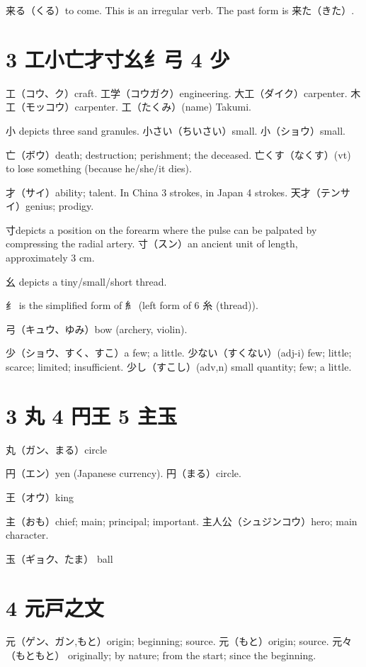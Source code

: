 来る（くる）to come.
This is an irregular verb.
The past form is 来た（きた）.

\section{3 工小亡才寸幺纟弓 4 少}

工（コウ、ク）craft.
工学（コウガク）engineering.
大工（ダイク）carpenter.
木工（モッコウ）carpenter.
工（たくみ）(name) Takumi.

小 depicts three sand granules.
小さい（ちいさい）small.
小（ショウ）small.

亡（ボウ）death; destruction; perishment; the deceased.
亡くす（なくす）(vt) to lose something (because he/she/it dies).

才（サイ）ability; talent.
In China 3 strokes, in Japan 4 strokes.
天才（テンサイ）genius; prodigy.

寸depicts a position on the forearm
where the pulse can be palpated by compressing the radial artery.
寸（スン）an ancient unit of length, approximately 3 cm.

幺 depicts a tiny/small/short thread.

纟 is the simplified form of 糹
(left form of 6 糸 (thread)).

弓（キュウ、ゆみ）bow (archery, violin).

少（ショウ、すく、すこ）a few; a little.
少ない（すくない）(adj-i) few; little; scarce; limited; insufficient.
少し（すこし）(adv,n) small quantity; few; a little.

\section{3 丸 4 円王 5 主玉}

丸（ガン、まる）circle

円（エン）yen (Japanese currency).
円（まる）circle.

王（オウ）king

主（おも）chief; main; principal; important.
主人公（シュジンコウ）hero; main character.

玉（ギョク、たま） ball

\section{4 元戸之文}

元（ゲン、ガン,もと）origin; beginning; source.
元（もと）origin; source.
元々（もともと）
originally; by nature; from the start; since the beginning.


